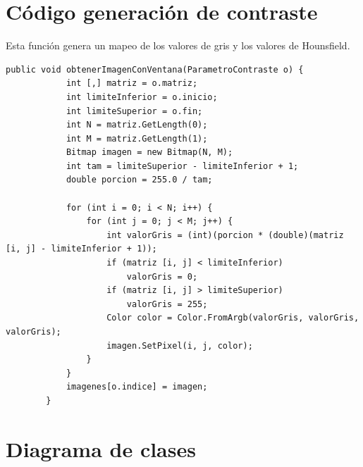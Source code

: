 \documentclass[12pt]{report}
\begin{document}
\chapter{Código generación de contraste}
Esta función genera un mapeo de los valores de gris y los valores de Hounsfield.
\lstset{language=C, breaklines=true, basicstyle=\footnotesize}
\lstset{numbers=left, numberstyle=\tiny, stepnumber=1, numbersep=-2pt}
\begin{lstlisting}[frame=single]
	public void obtenerImagenConVentana(ParametroContraste o) {
            int [,] matriz = o.matriz;
            int limiteInferior = o.inicio;
            int limiteSuperior = o.fin;
            int N = matriz.GetLength(0);
            int M = matriz.GetLength(1);
            Bitmap imagen = new Bitmap(N, M);
            int tam = limiteSuperior - limiteInferior + 1;
            double porcion = 255.0 / tam;

            for (int i = 0; i < N; i++) {
                for (int j = 0; j < M; j++) {
                    int valorGris = (int)(porcion * (double)(matriz [i, j] - limiteInferior + 1));
                    if (matriz [i, j] < limiteInferior)
                        valorGris = 0;
                    if (matriz [i, j] > limiteSuperior)
                        valorGris = 255;
                    Color color = Color.FromArgb(valorGris, valorGris, valorGris);
                    imagen.SetPixel(i, j, color);
                }
            }
            imagenes[o.indice] = imagen;
        }
\end{lstlisting}


\chapter{Diagrama de clases}
\end{document}
